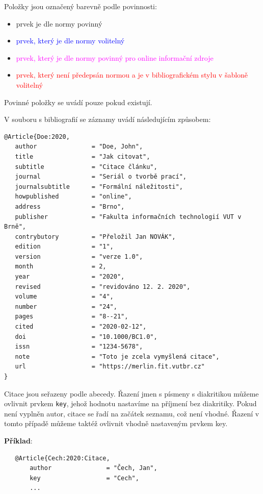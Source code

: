 \noindent Položky jsou označený barevně podle povinnosti:
\begin{itemize}
    \item prvek je dle normy povinný
    \item \textcolor{blue}{prvek, který je dle normy volitelný}
    \item \textcolor{magenta}{prvek, který je dle normy povinný pro online informační zdroje}
    \item \textcolor{red}{prvek, který není předepsán normou a je v bibliografickém stylu v šabloně volitelný}
\end{itemize}
Povinné položky se uvádí pouze pokud existují.

\newpage
\noindent V souboru s bibliografií se záznamy uvádí následujícím způsobem:
\begin{verbatim}
@Article{Doe:2020,
   author               = "Doe, John",
   title                = "Jak citovat",
   subtitle             = "Citace článku",
   journal              = "Seriál o tvorbě prací",
   journalsubtitle      = "Formální náležitosti",
   howpublished         = "online",
   address              = "Brno",
   publisher            = "Fakulta informačních technologií VUT v Brně",
   contrybutory         = "Přeložil Jan NOVÁK",
   edition              = "1",
   version              = "verze 1.0",
   month                = 2,
   year                 = "2020",
   revised              = "revidováno 12. 2. 2020",
   volume               = "4",
   number               = "24",
   pages                = "8--21",
   cited                = "2020-02-12",
   doi                  = "10.1000/BC1.0",
   issn                 = "1234-5678",
   note                 = "Toto je zcela vymyšlená citace",
   url                  = "https://merlin.fit.vutbr.cz"
}
\end{verbatim}

Citace jsou seřazeny podle abecedy. Řazení jmen s písmeny s diakritikou můžeme ovlivnit prvkem \texttt{key}, jehož  hodnotu nastavíme na příjmení bez diakritiky. Pokud není vyplněn autor, citace se řadí na začátek seznamu, což není vhodné. Řazení v tomto případě můžeme taktéž ovlivnit vhodně nastaveným prvkem key.

\medskip
\medskip
\noindent \textbf{Příklad}:
\begin{verbatim}
   @Article{Cech:2020:Citace,
	   author               = "Čech, Jan",
	   key                  = "Cech",
	   ... 
\end{verbatim}


\newpage
